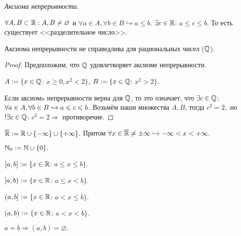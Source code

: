     \begin{definition}
        \textit{Аксиома непрерывности.} 
        
        $\forall A, B \subset \mathbb{R}: A, B \neq \varnothing$ и $\forall a \in A, \forall b \in B \hookrightarrow a \leq b.$ $\exists c \in \mathbb{R}$: $a \leq c \leq b.$ То есть существует <<разделительное число>>.
    \end{definition}

    \begin{note}
        Аксиома непрерывности не справедлива для рациональных чисел ($\mathbb{Q}$).
    \end{note}
    \begin{proof}
        Предположим, что $\mathbb{Q}$ удовлетворяет аксиоме непрерывности.

        $A := \{ x \in \mathbb{Q}$: $x \geq 0, x^2 < 2\}$, $B := \{ x \in \mathbb{Q}$: $x^2 > 2 \}$.

        Если аксиомa непрерывности верна для $\mathbb{Q}$, то это означает, что $\exists c \in \mathbb{Q}$: $\forall a \in A, \newline \forall b \in B \hookrightarrow a \leq c \leq b$. Возьмём наши множества $A, B$, тогда $c^2 = 2,$ но $! \exists c \in \mathbb{Q}$: $c^2 = 2 \Rightarrow$ противоречие.
    \end{proof}

    \begin{definition}
        $\overline{\mathbb{R}} := \mathbb{R} \cup \{ -\infty \} \cup \{ +\infty \}.$ Притом $\forall x \in \overline{\mathbb{R}} \neq \pm \infty \hookrightarrow -\infty < x < +\infty.$
    \end{definition}
    \begin{definition}
        $\mathbb{N}_{0} := \mathbb{N} \cup \{ 0 \}.$
    \end{definition}

    \begin{definition}
        $[a, b] := \{x \in \mathbb{R}$: $a \leq x \leq b \}.$
    \end{definition}
    \begin{definition}
        $[a, b) := \{x \in \mathbb{R}$: $a \leq x < b \}.$
    \end{definition}
    \begin{definition}
        $(a, b] := \{x \in \mathbb{R}$: $a < x \leq b \}.$
    \end{definition}
    
    \begin{definition}
        $(a, b) := \{x \in \mathbb{R}$: $a < x < b \}.$
    \end{definition}
    \begin{definition}
        $a = b \Rightarrow (a, b) = \varnothing .$
    \end{definition}

